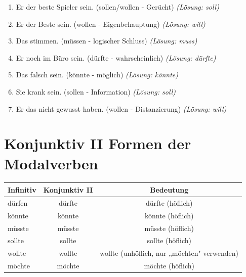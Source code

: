 \begin{enumerate}
    \item Er \underline{\hspace{1cm}} der beste Spieler sein. (sollen/wollen - Gerücht) \quad \textit{(Lösung: soll)}
    \item Er \underline{\hspace{1cm}} der Beste sein. (wollen - Eigenbehauptung) \quad \textit{(Lösung: will)}
    \item Das \underline{\hspace{1cm}} stimmen. (müssen - logischer Schluss) \quad \textit{(Lösung: muss)}
    \item Er \underline{\hspace{1cm}} noch im Büro sein. (dürfte - wahrscheinlich) \quad \textit{(Lösung: dürfte)}
    \item Das \underline{\hspace{1cm}} falsch sein. (könnte - möglich) \quad \textit{(Lösung: könnte)}
    \item Sie \underline{\hspace{1cm}} krank sein. (sollen - Information) \quad \textit{(Lösung: soll)}
    \item Er \underline{\hspace{1cm}} das nicht gewusst haben. (wollen - Distanzierung) \quad \textit{(Lösung: will)}
\end{enumerate}

\section{Konjunktiv II Formen der Modalverben}
\label{sec:ModalKonjunktivII}

\begin{center}
\begin{tabular}{|l|c|c|}
\hline
\textbf{Infinitiv} & \textbf{Konjunktiv II} & \textbf{Bedeutung} \\ \hline
dürfen & dürfte & dürfte (höflich) \\ \hline
könnte & könnte & könnte (höflich) \\ \hline
müsste & müsste & müsste (höflich) \\ \hline
sollte & sollte & sollte (höflich) \\ \hline
wollte & wollte & wollte (unhöflich, nur „möchten" verwenden) \\ \hline
möchte & möchte & möchte (höflich) \\ \hline
\end{tabular}
\end{center}

\chapterend